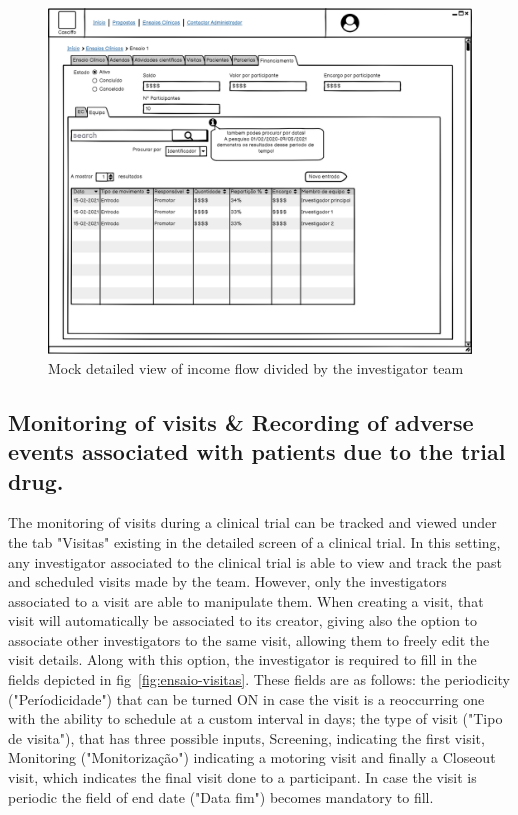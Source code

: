 \begin{figure}
    \centering
    \includegraphics{images/ensaio-finance-team.png}
    \caption{Mock detailed view of income flow divided by the investigator team}
    \label{fig:ensaio-finance-team}
\end{figure}

\subsection{Monitoring of visits \& Recording of adverse events associated with patients due to the trial drug.} 
The monitoring of visits during a clinical trial can be tracked and viewed under the tab "Visitas" existing in the detailed screen of a clinical trial.
In this setting, any investigator associated to the clinical trial is able to view and track the past and scheduled visits made by the team. However, only the investigators associated to a visit are able to manipulate them. When creating a visit, that visit will automatically be associated to its creator, giving also the option to associate other investigators to the same visit, allowing them to freely edit the visit details. Along with this option, the investigator is required to fill in the fields depicted in fig~\ref{fig:ensaio-visitas}. These fields are as follows: the periodicity ("Períodicidade") that can be turned ON in case the visit is a reoccurring one with the ability to schedule at a custom interval in days; the type of visit ("Tipo de visita"), that has three possible inputs, Screening, indicating the first visit, Monitoring ("Monitorização") indicating a motoring visit and finally a Closeout visit, which indicates the final visit done to a participant. In case the visit is periodic the field of end date ("Data fim") becomes mandatory to fill.  

